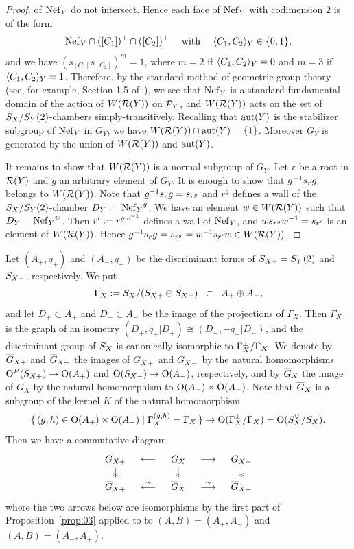 \documentclass{amsart}
\numberwithin{procedure}{section}
\begin{document}
\begin{proof}
of $\mathord{\rm Nef}_{Y}$ do not intersect.
Hence
each face of $\mathord{\rm Nef}_{Y}$ with codimension $2$ 
is of the form
\[\mathord{\rm Nef}_{Y}\cap ([C_1])\sp{\perp} \cap ([C_2])\sp{\perp} \quad \mbox{ with } \quad  \langle C_1, C_2 \rangle_Y\in \{0, 1\},\]
and we have $(s_{[C_1]} s_{[C_2]})^m=1$, 
where $m=2$ if $\langle C_1, C_2 \rangle_Y=0$ and $m=3$ if $\langle C_1, C_2 \rangle_Y=1$.
Therefore, by the standard method of geometric group theory
(see, for example, Section 1.5 of~\cite{VinbergShvartsman1993}), 
we see that $\mathord{\rm Nef}_{Y}$ is 
a standard fundamental domain of the action of $W(\mathord{\mathcal R}(Y))$ on $\mathord{\mathcal P}_Y$,
and $W(\mathord{\mathcal R}(Y))$ acts on the set of $S_{X}/S_{Y}(2)$-chambers simply-transitively.
Recalling that $\mathord{\rm{aut}}(Y)$ is the stabilizer subgroup of
$\mathord{\rm Nef}_{Y}$ in $G_Y$,  we have $W(\mathord{\mathcal R}(Y))\cap  \mathord{\rm{aut}}(Y)=\{1\}$.
Moreover $G_Y$ is generated by the union of $W(\mathord{\mathcal R}(Y))$ and $\mathord{\rm{aut}}(Y)$.
\par
It remains to show that $W(\mathord{\mathcal R}(Y))$ is a normal subgroup of 
$G_Y$.
Let $r$ be a root in $\mathord{\mathcal R}(Y)$ and $g$ an arbitrary element of $G_Y$.
It is enough to show that $g\sp{-1} s_r g$ 
belongs to   $W(\mathord{\mathcal R}(Y))$.
Note that  $g\sp{-1} s_r g=s_{r^g}$ and $r^g$ defines a wall of 
the $S_{X}/S_{Y}(2)$-chamber $D_Y:={\mathord{\rm Nef}_{Y}}^g$.
We have an element $w\in W(\mathord{\mathcal R}(Y))$ such that $D_Y={\mathord{\rm Nef}_{Y}}^w$.
Then $r\sp\prime:=r^{gw\sp{-1}}$ defines a wall of $\mathord{\rm Nef}_{Y}$, and 
$w s_{r^g} w\sp{-1} =s_{r\sp\prime}$ is an element of $W(\mathord{\mathcal R}(Y))$.
Hence  $g\sp{-1} s_r g=s_{r^g}=w\sp{-1} s_{r\sp\prime} w \in W(\mathord{\mathcal R}(Y))$.
%
\end{proof}
%
Let $(A_+, q_+)$ and $(A_-, q_-)$ be
the discriminant forms of $S_{X+}=S_{Y}(2)$ and $S_{X-}$, respectively.
We put 
\[
\Gamma_X:=S_{X}/(S_{X+}\oplus S_{X-})\;\; \subset\;\; A_+\oplus A_-,
\]
and let $D_+\subset A_+$ and $D_-\subset A_-$ be the image of the projections of $\Gamma_X$.
Then $\Gamma_X$ is the graph of an isometry
$(D_+, q_+|D_+)\cong (D_-, -q_-|D_-)$,
and the discriminant group of $S_{X}$ is canonically isomorphic to
$\Gamma_X\sp{\perp}/\Gamma_X$.
We denote 
by $\overline{G}_{X+}$ and $\overline{G}_{X-}$ the images of
$G_{X+}$ and $G_{X-}$ by the natural homomorphisms
$\mathord{\mathrm{O}}^{\mathord{\mathcal P}}(S_{X+})\to \mathord{\mathrm{O}}(A_{+})$ and $\mathord{\mathrm{O}}(S_{X-})\to \mathord{\mathrm{O}}(A_{-})$,
respectively,
and 
by  $\overline{G}_{X}$ the image of $G_X$ 
 by the natural homomorphism to $\mathord{\mathrm{O}}(A_{+}) \times \mathord{\mathrm{O}}(A_{-})$.
Note that  $\overline{G}_X$ is a subgroup
of the kernel $K$ of the natural homomorphism 
\[
\{\,{(g, h) \in \mathord{\mathrm{O}}(A_+)\times \mathord{\mathrm{O}}(A_-)}\mid {\Gamma_X^{(g, h)}=\Gamma_X} \,\}\to 
\mathord{\mathrm{O}}(\Gamma_X\sp{\perp}/\Gamma_X)=\mathord{\mathrm{O}}(S_{X}\sp{\vee}/S_{X}).
\]
Then we have a commutative diagram
%
\begin{equation}\label{eq:Gdiagram}
\renewcommand{\arraystretch}{1.2}
\begin{array}{ccccc}
G_{X+} & \longleftarrow & G_X & \longrightarrow  & G_{X-} \\
\mapdownsurj& & \mapdownsurj& & \mapdownsurj \\
\Gbar_{X+} &\mapleftisom & \Gbar_X & \maprightisom  & \Gbar_{X-} \\
\end{array}
\end{equation}
%
where the two arrows below are isomorphisms by 
the first part of Proposition~\ref{prop:03} applied to to $(A, B)=(A_+, A_-)$ and $(A, B)=(A_-, A_+)$.
\end{document}
